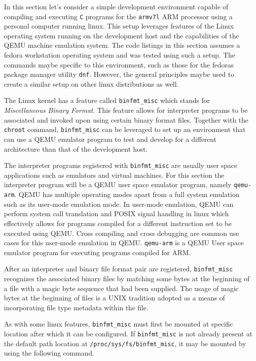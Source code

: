 In this section let's consider a simple development environment capable of compiling and executing \texttt{C} programs for the \texttt{armv7l} ARM processor using a personal computer running linux. This setup leverages features of the Linux operating system running on the development host and the capabilities of the QEMU machine emulation system. The code listings in this section assumes a fedora workstation operating system and was tested using such a setup. The commands maybe specific to this environment, such as those for the fedora\textquotesingle s package manager utility \texttt{dnf}. However, the general principles maybe used to create a similar setup on other linux distributions as well.

The Linux kernel has a feature called \texttt{binfmt\_misc} which stands for \textit{Miscellaneous Binary Format}. This feature allows for interpreter programs to be associated and invoked upon using certain binary format files. Together with the \texttt{chroot} command, \texttt{binfmt\_misc} can be leveraged to set up an environment that can use a QEMU emulator program to test and develop for a different architecture than that of the development host.

The interpreter programs registered with \texttt{binfmt\_misc} are usually user space applications such as emulators and virtual machines. For this section the interpreter program will be a QEMU user space emulator program, namely \texttt{qemu-arm}. QEMU has multiple operating modes apart from a full system emulation such as its user-mode emulation mode. In user-mode emulation, QEMU can perform system call translation and POSIX signal handling in linux which effectively allows for programs compiled for a different instruction set to be executed using QEMU. Cross compiling and cross debugging are common use cases for this user-mode emulation in QEMU. \texttt{qemu-arm} is a QEMU User space emulator program for executing programs compiled for ARM.

After an interpreter and binary file format pair are registered, \texttt{binfmt\_misc} recognizes the associated binary files by matching some bytes at the beginning of a file with a magic byte sequence that had been supplied. The usage of magic bytes at the beginning of files is a UNIX tradition adopted as a means of incorporating file type metadata within the file.

As with some linux features, \texttt{binfmt\_misc} must first be mounted at specific location after which it can be configured. If \texttt{binfmt\_misc} is not already present at the default path location at \texttt{/proc/sys/fs/binfmt\_misc}, it may be mounted by using the following command.

